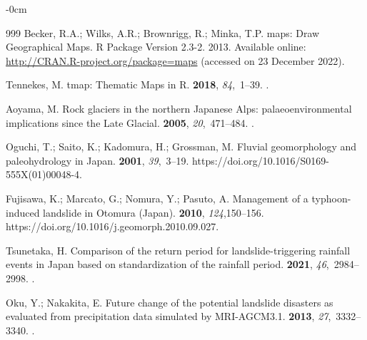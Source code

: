 \documentclass[land,article,accept,pdftex,moreauthors]{Definitions/mdpi}
\begin{document}
\begin{adjustwidth}{-\extralength}{0cm}
\begin{thebibliography}{999}
Becker, R.A.; Wilks, A.R.; Brownrigg, R.; Minka, T.P.
\newblock maps: Draw Geographical Maps. R Package Version 2.3-2. 2013. Available online: \url{http://CRAN.R-project.org/package=maps}  (accessed on 23 December 2022).%

Tennekes, M.
\newblock tmap: Thematic Maps in R.
 {\bf 2018}, {\em 84},~1--39.
.

Aoyama, M.
\newblock Rock glaciers in the northern Japanese Alps: palaeoenvironmental
  implications since the Late Glacial.
 {\bf 2005}, {\em 20},~471--484.
.

Oguchi, T.; Saito, K.; Kadomura, H.; Grossman, M.
\newblock Fluvial geomorphology and paleohydrology in Japan.
 {\bf 2001}, {\em 39},~3--19.
  {{https://doi.org/10.1016/S0169-555X(01)00048-4}}.

Fujisawa, K.; Marcato, G.; Nomura, Y.; Pasuto, A.
\newblock Management of a typhoon-induced landslide in Otomura (Japan).
 {\bf 2010}, {\em 124},150--156.
  {{https://doi.org/10.1016/j.geomorph.2010.09.027}}.

Tsunetaka, H.
\newblock Comparison of the return period for landslide-triggering rainfall
  events in Japan based on standardization of the rainfall period.
 {\bf 2021}, {\em
  46},~2984--2998.
.

Oku, Y.; Nakakita, E.
\newblock Future change of the potential landslide disasters as evaluated from
  precipitation data simulated by MRI-AGCM3.1.
 {\bf 2013}, {\em 27},~3332--3340.
.


\end{thebibliography}
\end{adjustwidth}
\end{document}
